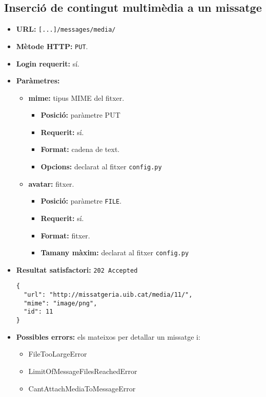 \subsection{Inserció de contingut multimèdia a un missatge}
\begin{itemize}
\item \textbf{\ac{URL}:} \verb$[...]/messages/media/$
\item \textbf{Mètode \ac{HTTP}: } \texttt{PUT}.
\item \textbf{Login requerit:} sí.
\item \textbf{Paràmetres:}
	\begin{itemize}
		\item \textbf{mime:} tipus \ac{MIME} del fitxer.
		\begin{itemize}
			\item \textbf{Posició:} paràmetre \ac{PUT}
			\item \textbf{Requerit:} sí.
			\item \textbf{Format:} cadena de text.
			\item \textbf{Opcions:} declarat al fitxer \texttt{config.py}
		\end{itemize}
		\item \textbf{avatar:} fitxer.
		\begin{itemize}
			\item \textbf{Posició:} paràmetre \texttt{FILE}.
			\item \textbf{Requerit:} sí.
			\item \textbf{Format:} fitxer.
			\item \textbf{Tamany màxim:} declarat al fitxer \texttt{config.py}
		\end{itemize}
	\end{itemize}
	\item \textbf{Resultat satisfactori:} \texttt{202 Accepted}
	\begin{verbatim}
{
  "url": "http://missatgeria.uib.cat/media/11/",
  "mime": "image/png",
  "id": 11
}
	\end{verbatim}
	
	\item \textbf{Possibles errors:} els mateixos per detallar un missatge i:
	\begin{itemize}
		\item FileTooLargeError
		\item LimitOfMessageFilesReachedError
		\item CantAttachMediaToMessageError
	\end{itemize}
\end{itemize}


